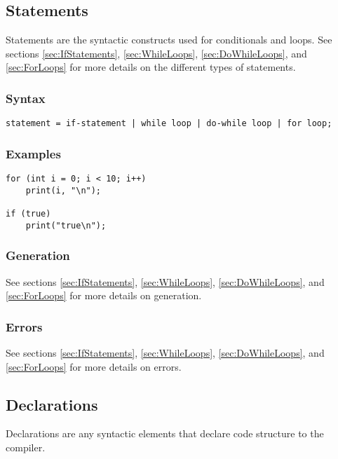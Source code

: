 \documentclass[10pt,a4paper]{article}
\begin{document}
\newpage






\subsection{Statements}
\label{sec:Statements}
Statements are the syntactic constructs used for conditionals and loops. See sections \ref{sec:IfStatements}, \ref{sec:WhileLoops}, \ref{sec:DoWhileLoops}, and \ref{sec:ForLoops} for more details on the different types of statements.

\subsubsection{Syntax}
\begin{verbatim}
statement = if-statement | while loop | do-while loop | for loop;
\end{verbatim}

\subsubsection{Examples}
\begin{verbatim}
for (int i = 0; i < 10; i++)
    print(i, "\n");

if (true)
    print("true\n");
\end{verbatim}

\subsubsection{Generation}See sections \ref{sec:IfStatements}, \ref{sec:WhileLoops}, \ref{sec:DoWhileLoops}, and \ref{sec:ForLoops} for more details on generation.


\subsubsection{Errors}
See sections \ref{sec:IfStatements}, \ref{sec:WhileLoops}, \ref{sec:DoWhileLoops}, and \ref{sec:ForLoops} for more details on errors.

\newpage





\subsection{Declarations}
\label{sec:Declarations}
Declarations are any syntactic elements that declare code structure to the compiler.
\end{document}
